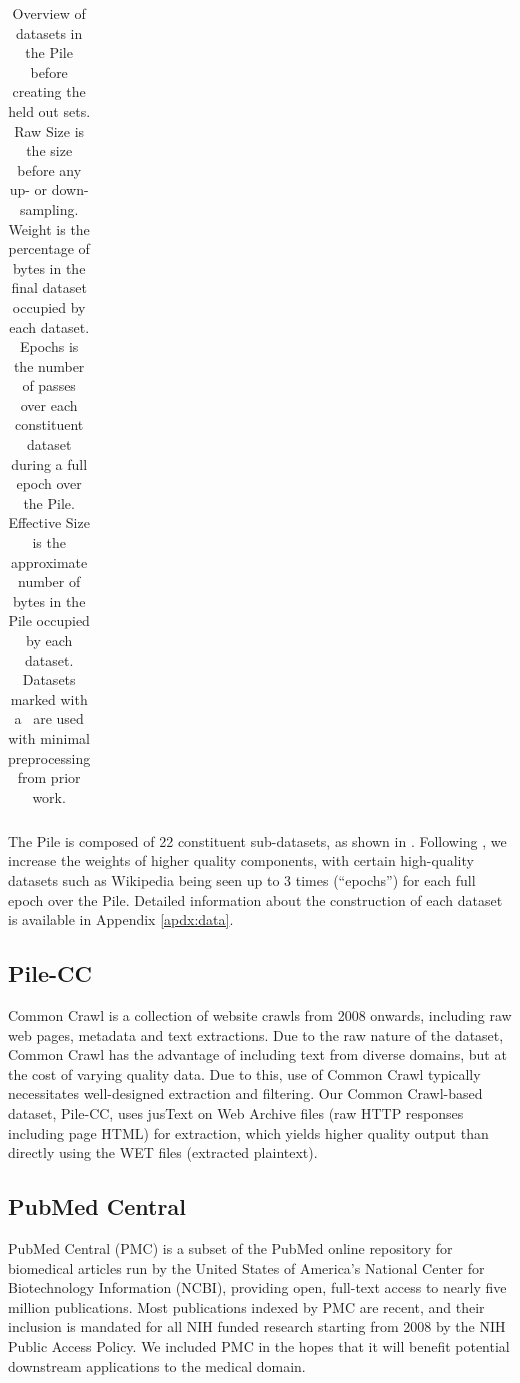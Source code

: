 \documentclass[11pt,a4paper]{article}
\begin{document}
\begin{table}[ht]
\begin{tabular}{l r r r r r}
    \end{tabular}
\caption{Overview of datasets in the Pile before creating the held out sets. Raw Size is the size before any up- or down-sampling. Weight is the percentage of bytes in the final dataset occupied by each dataset. Epochs is the number of passes over each constituent dataset during a full epoch over the Pile. Effective Size is the approximate number of bytes in the Pile occupied by each dataset. Datasets marked with a \textdagger\ are used with minimal preprocessing from prior work.} 
\label{table:pile_overview}
\end{table}

The Pile is composed of 22 constituent sub-datasets, as shown in . 
Following \citet{GPT3}, we increase the weights of higher quality components, with certain high-quality datasets such as Wikipedia being seen up to 3 times (``epochs'') for each full epoch over the Pile.
Detailed information about the construction of each dataset is available in Appendix \ref{apdx:data}.

\subsection{Pile-CC}

Common Crawl is a collection of website crawls from 2008 onwards, including raw web pages, metadata and text extractions. Due to the raw nature of the dataset, Common Crawl has the advantage of including text from diverse domains, but at the cost of varying quality data. Due to this, use of Common Crawl typically necessitates well-designed extraction and filtering. Our Common Crawl-based dataset, Pile-CC, uses jusText \citep{justext} on Web Archive files (raw HTTP responses including page HTML) for extraction, which yields higher quality output than directly using the WET files (extracted plaintext). 

\subsection{PubMed Central}\label{subsection:pmc}

PubMed Central (PMC) is a subset of the PubMed online repository for biomedical articles run by the United States of America's National Center for Biotechnology Information (NCBI), providing open, full-text access to nearly five million publications. Most publications indexed by PMC are recent, and their inclusion is mandated for all NIH funded research starting from 2008 by the NIH Public Access Policy. We included PMC in the hopes that it will benefit potential downstream applications to the medical domain.
\end{document}
